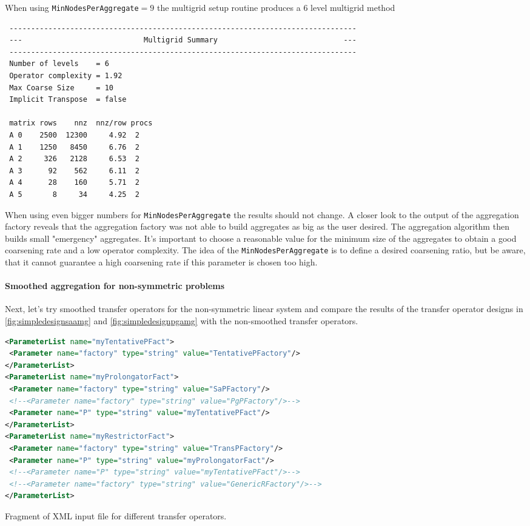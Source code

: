 \documentclass[12pt,a4paper]{article}
\begin{document}
When using \verb|MinNodesPerAggregate|$=9$ the multigrid setup routine produces a 6 level multigrid method
{\footnotesize
\begin{verbatim}
 --------------------------------------------------------------------------------
 ---                            Multigrid Summary                             ---
 --------------------------------------------------------------------------------
 Number of levels    = 6
 Operator complexity = 1.92
 Max Coarse Size     = 10
 Implicit Transpose  = false
 
 matrix rows    nnz  nnz/row procs
 A 0    2500  12300     4.92  2
 A 1    1250   8450     6.76  2
 A 2     326   2128     6.53  2
 A 3      92    562     6.11  2
 A 4      28    160     5.71  2
 A 5       8     34     4.25  2
\end{verbatim}}

When using even bigger numbers for \verb|MinNodesPerAggregate| the results should not change. A closer look to the output of the aggregation factory reveals that the aggregation factory was not able to build aggregates as big as the user desired. The aggregation algorithm then builds small "emergency" aggregates. It's important to choose a reasonable value for the minimum size of the aggregates to obtain a good coarsening rate and a low operator complexity. The idea of the \verb|MinNodesPerAggregate| is to define a desired coarsening ratio, but be aware, that it cannot guarantee a high coarsening rate if this parameter is chosen too high.

\paragraph{Smoothed aggregation for non-symmetric problems}
Next, let's try smoothed transfer operators for the non-symmetric linear system and compare the results of the transfer operator designs in \ref{fig:simpledesignsaamg} and \ref{fig:simpledesignpgamg} with the non-smoothed transfer operators.

\begin{Listing}
\begin{center}
\begin{lstlisting}[language=xml]
<ParameterList name="myTentativePFact">
 <Parameter name="factory" type="string" value="TentativePFactory"/>
</ParameterList>
<ParameterList name="myProlongatorFact">
 <Parameter name="factory" type="string" value="SaPFactory"/>
 <!--<Parameter name="factory" type="string" value="PgPFactory"/>-->
 <Parameter name="P" type="string" value="myTentativePFact"/>
</ParameterList>
<ParameterList name="myRestrictorFact">
 <Parameter name="factory" type="string" value="TransPFactory"/>
 <Parameter name="P" type="string" value="myProlongatorFact"/>
 <!--<Parameter name="P" type="string" value="myTentativePFact"/>-->
 <!--<Parameter name="factory" type="string" value="GenericRFactory"/>-->
</ParameterList>
\end{lstlisting}
\caption{Fragment of XML input file for different transfer operators.} 
\label{listing:Transfers}
\end{center}
\end{Listing}
\end{document}
